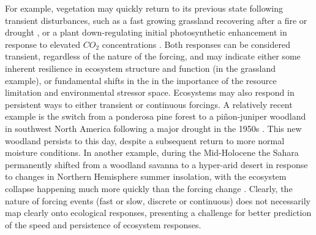 \documentclass[11pt,a4paper,oneside]{article}
\begin{document}
For example, vegetation may quickly return to its previous state following transient disturbances, such as a fast growing grassland recovering after a fire or drought \citep[e.g.,][]{Weaver1936,albertson1944}, or a plant down-regulating initial photosynthetic enhancement in response to elevated $CO_{2}$ concentrations \citep{eatonrye2012}. Both responses can be considered transient, regardless of the nature of the forcing, and may indicate either some inherent resilience in ecosystem structure and function (in the grassland example), or fundamental shifts in the in the importance of the resource limitation and environmental stressor space. Ecosystems may also respond in persistent ways to either transient or continuous forcings. A relatively recent example is the switch from a ponderosa pine forest to a pi\~non-juniper woodland in southwest North America following a major drought in the 1950s \citep{Allen1998}. This new woodland persists to this day, despite a subsequent return to more normal moisture conditions. In another example, during the Mid-Holocene the Sahara permanently shifted from a woodland savanna to a hyper-arid desert in response to changes in Northern Hemisphere summer insolation, with the ecosystem collapse happening much more quickly than the forcing change \citep{Foley2003}. Clearly, the nature of forcing events (fast or slow, discrete or continuous) does not necessarily map clearly onto ecological responses, presenting a challenge for better prediction of the speed and persistence of ecosystem responses.
\end{document}
